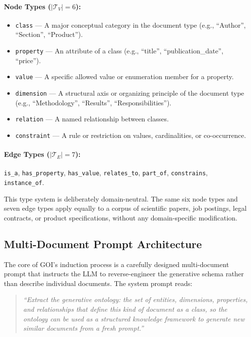 \documentclass[runningheads,a4paper]{llncs}
\begin{document}
\paragraph{Node Types ($|\mathcal{T}_V| = 6$):}
\begin{itemize}
  \item \texttt{class} --- A major conceptual category in the document
    type (e.g., ``Author'', ``Section'', ``Product'').
  \item \texttt{property} --- An attribute of a class (e.g., ``title'',
    ``publication\_date'', ``price'').
  \item \texttt{value} --- A specific allowed value or enumeration
    member for a property.
  \item \texttt{dimension} --- A structural axis or organizing principle
    of the document type (e.g., ``Methodology'', ``Results'',
    ``Responsibilities'').
  \item \texttt{relation} --- A named relationship between classes.
  \item \texttt{constraint} --- A rule or restriction on values,
    cardinalities, or co-occurrence.
\end{itemize}

\paragraph{Edge Types ($|\mathcal{T}_E| = 7$):}
\texttt{is\_a}, \texttt{has\_property}, \texttt{has\_value},
\texttt{relates\_to}, \texttt{part\_of}, \texttt{constrains},
\texttt{instance\_of}.

This type system is deliberately domain-neutral. The same six node types
and seven edge types apply equally to a corpus of scientific papers, job
postings, legal contracts, or product specifications, without any
domain-specific modification.

\subsection{Multi-Document Prompt Architecture}

The core of GOI's induction process is a carefully designed
multi-document prompt that instructs the LLM to reverse-engineer the
generative schema rather than describe individual documents. The system
prompt reads:

\begin{quote}
\textit{``Extract the generative ontology: the set of entities,
dimensions, properties, and relationships that define this kind of
document as a class, so the ontology can be used as a structured
knowledge framework to generate new similar documents from a fresh
prompt.''}
\end{quote}
\end{document}
